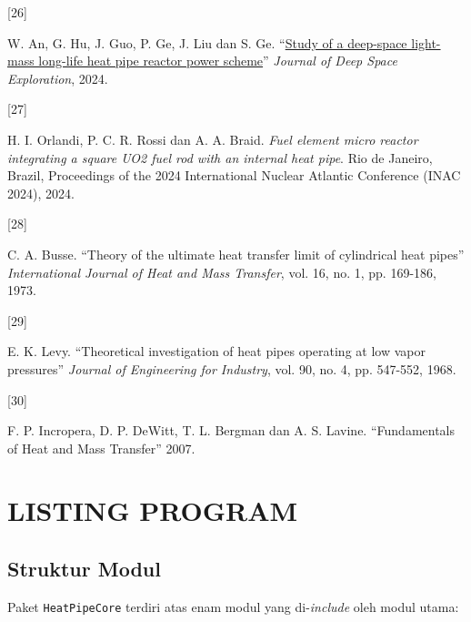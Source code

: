 \documentclass[
  indonesian,
  12pt,
  a4paper,
]{report}
\newlength{\cslhangindent}
\newlength{\csllabelwidth}
\newenvironment{CSLReferences}[2] %
 {\begin{list}{}{%
  \setlength{\itemindent}{0pt}
  \setlength{\leftmargin}{0pt}
  \setlength{\parsep}{0pt}
  \ifodd #1
   \setlength{\leftmargin}{\cslhangindent}
   \setlength{\itemindent}{-1\cslhangindent}
  \fi
  \setlength{\itemsep}{#2\baselineskip}}}
 {\end{list}}
\newcommand{\CSLLeftMargin}[1]{\parbox[t]{\csllabelwidth}{\strut#1\strut}}
\newcommand{\CSLRightInline}[1]{\parbox[t]{\linewidth - \csllabelwidth}{\strut#1\strut}}
\renewcommand{\thechapter}{BAB~\Roman{chapter}}
\renewcommand{\thesection}{\Roman{chapter}.\arabic{section}}
\renewcommand{\thefigure}{\arabic{chapter}.\arabic{figure}}
\renewcommand{\thetable}{\arabic{chapter}.\arabic{table}}
\renewcommand{\theequation}{\arabic{chapter}.\arabic{equation}}
\newcommand{\appendixmode}{%
  \appendix
  \renewcommand{\thechapter}{LAMPIRAN~\Alph{chapter}}%
  \renewcommand{\thesection}{\Alph{chapter}.\arabic{section}}%
  \renewcommand{\thefigure}{\Alph{chapter}.\arabic{figure}}%
  \renewcommand{\thetable}{\Alph{chapter}.\arabic{table}}%
  \renewcommand{\theequation}{\Alph{chapter}.\arabic{equation}}%
}
\begin{document}
\begin{CSLReferences}{0}{1}
\CSLLeftMargin{{[}26{]} }%
\CSLRightInline{W. An, G. Hu, J. Guo, P. Ge, J. Liu dan S. Ge.
{``\href{https://doi.org/10.15982/j.issn.2096-9287.2024.20230127}{Study
of a deep-space light-mass long-life heat pipe reactor power scheme}''}
\emph{Journal of Deep Space Exploration}, 2024.}

\CSLLeftMargin{{[}27{]} }%
\CSLRightInline{H. I. Orlandi, P. C. R. Rossi dan A. A. Braid.
\emph{Fuel element micro reactor integrating a square {UO2} fuel rod
with an internal heat pipe}. Rio de Janeiro, Brazil, Proceedings of the
2024 International Nuclear Atlantic Conference (INAC 2024), 2024.}

\CSLLeftMargin{{[}28{]} }%
\CSLRightInline{C. A. Busse. {``Theory of the ultimate heat transfer
limit of cylindrical heat pipes''} \emph{International Journal of Heat
and Mass Transfer}, vol. 16, no. 1, pp. 169-186, 1973.}

\CSLLeftMargin{{[}29{]} }%
\CSLRightInline{E. K. Levy. {``Theoretical investigation of heat pipes
operating at low vapor pressures''} \emph{Journal of Engineering for
Industry}, vol. 90, no. 4, pp. 547-552, 1968.}

\CSLLeftMargin{{[}30{]} }%
\CSLRightInline{F. P. Incropera, D. P. DeWitt, T. L. Bergman dan A. S.
Lavine. {``Fundamentals of Heat and Mass Transfer''} 2007.}

\end{CSLReferences}

\appendixmode

\chapter{LISTING PROGRAM}\label{listing-program}

\section{Struktur Modul}\label{struktur-modul}

Paket \texttt{HeatPipeCore} terdiri atas enam modul yang
di-\emph{include} oleh modul utama:
\end{document}
